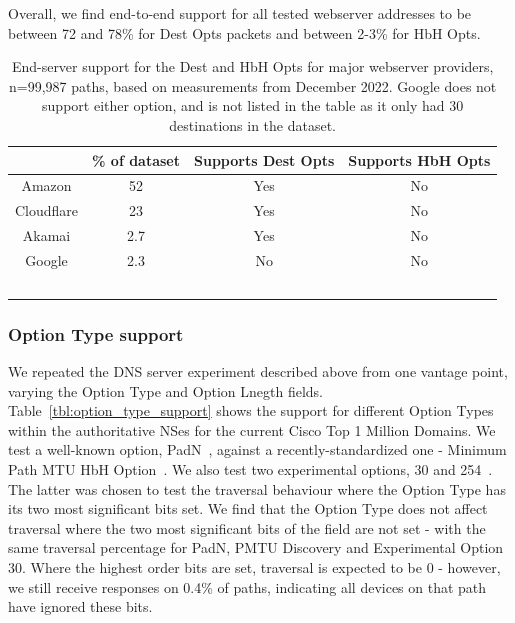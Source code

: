 \documentclass[conference]{IEEEtran}
\begin{document}
Overall, we find end-to-end support for all tested webserver addresses to be between 72 and 78\% for Dest Opts packets and between 2-3\% for HbH Opts.


\begin{table}[]
\begin{tabular}{c|c|c|c}
           & \% of dataset & Supports Dest Opts & Supports HbH Opts \\
\hline
Amazon & 52                      & Yes                & No                 \\
\hline
Cloudflare     & 23                     & Yes                 & No                 \\
\hline
Akamai    & 2.7                     & Yes                & No                 \\
\hline
Google      & 2.3                     & No                 & No                 \\
\
\end{tabular}
\label{tbl:web_provider_support}
\caption{End-server support for the Dest and HbH Opts for major webserver providers, n=99,987 paths, based on measurements from December 2022. Google does not support either option, and is not listed in the table as it only had 30 destinations in the dataset.
}
\end{table}


\subsubsection{Option Type support}

We repeated the DNS server experiment described above from one vantage point, varying the Option Type and Option Lnegth fields. 
Table~\ref{tbl:option_type_support} shows the support for different Option Types within the authoritative NSes for the current Cisco Top 1 Million Domains. We test a well-known option, PadN~\cite{rfc2460}, against a recently-standardized one - Minimum Path MTU HbH Option~\cite{rfc9268}. We also test two experimental options, 30 and 254~\cite{RFC4727}. The latter was chosen to test the traversal behaviour where the Option Type has its two most significant bits set.
We find that the Option Type does not affect traversal where the two most significant bits of the field are not set - with the same traversal percentage for PadN, PMTU Discovery and Experimental Option 30. Where the highest order bits are set, traversal is expected to be 0 - however, we still receive responses on 0.4\% of paths, indicating all devices on that path have ignored these bits.
\end{document}
